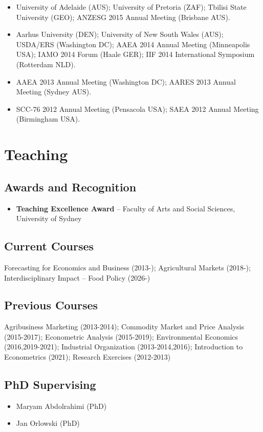 \documentclass[10pt]{article}
\begin{document}
\begin{itemize}
		\item {} University of Adelaide (AUS); University of Pretoria (ZAF); Tbilisi State University (GEO); ANZESG 2015 Annual Meeting (Brisbane AUS).
		\item {} Aarhus University (DEN); University of New South Wales (AUS); USDA/ERS (Washington DC); AAEA 2014 Annual Meeting (Minneapolis USA); IAMO 2014 Forum (Haale GER); IIF 2014 International Symposium (Rotterdam NLD).
		\item {} AAEA 2013 Annual Meeting (Washington DC); AARES 2013 Annual Meeting (Sydney AUS).
		\item {} SCC-76 2012 Annual Meeting (Pensacola USA); SAEA 2012 Annual Meeting (Birmingham USA).
	\end{itemize}
	
	\bigskip
	
	\section*{Teaching}
	
	\subsection*{Awards and Recognition}
	\begin{itemize}
		\item {} \textbf{Teaching Excellence Award} -- Faculty of Arts and Social Sciences, University of Sydney
	\end{itemize}
	
	\subsection*{Current Courses}
	Forecasting for Economics and Business (2013-); Agricultural Markets (2018-); Interdisciplinary Impact -- Food Policy (2026-)
	
	\subsection*{Previous Courses}	
	Agribusiness Marketing (2013-2014); Commodity Market and Price Analysis (2015-2017); Econometric Analysis (2015-2019); Environmental Economics (2016,2019-2021); Industrial Organization (2013-2014,2016); Introduction to Econometrics (2021); Research Exercises (2012-2013)
	
	\subsection*{PhD Supervising}	
	\begin{itemize}
		\item {} Maryam Abdolrahimi (PhD)
		\item {} Jan Orlowski (PhD)
	\end{itemize}
	
\end{document}
